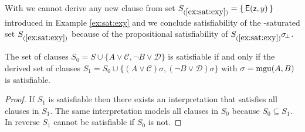 \begin{example}
	With \InstGen we cannot derive any new clause from set 
	$S_{(\ref{ex:sat:exy})  } = \{\,{\mathsf{E}}({\mathsf z},y)\,\}$ 
	introduced in Example \ref{ex:sat:exy} and we conclude satisfiability
	of the \InstGen-saturated set $S_{(\ref{ex:sat:exy})  }$ 
	because of the propositional satisfiability of $S_{(\ref{ex:sat:exy})  }\sigma\!_\bot$.
\end{example}

\begin{lemma}
	The set of clauses 
	$S_0 = S \cup
	\{ 
		 A\lor\mathcal C, \lnot B\lor\mathcal D
	\}$ 
	is satisfiable if and only if
	the derived set of clauses 
	$S_1 = S_0 \cup \{ (A\lor\mathcal C)\sigma, (\lnot B\lor\mathcal D)\sigma\}$
	with $\sigma = \operatorname{mgu}(A,B)$ is satisfiable.
\end{lemma}

\begin{proof}
	If $S_1$ is satisfiable then there exists an interpretation that satisfies all clauses in $S_1$. 
	The same interpretation models all clauses in $S_0$ because $S_0\subseteq S_1$.
	In reverse $S_1$ cannot be satisfiable if $S_0$ is not.
	
	
\end{proof}


